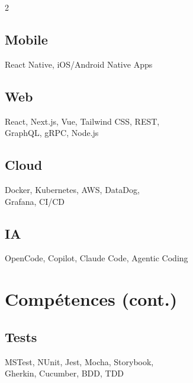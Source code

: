 \documentclass{article}
\begin{document}
\begin{paracol}{2}
\begin{leftcolumn}
    \subsection{Mobile}
    React Native, iOS/Android Native Apps

    \vspace{0.5em}

    \subsection{Web}
    React, Next.js, Vue, Tailwind CSS, REST, \\
    GraphQL, gRPC, Node.js

    \vspace{0.5em}

    \subsection{Cloud}
    Docker, Kubernetes, AWS, DataDog,\\
    Grafana, CI/CD

    \vspace{0.5em}

    \subsection{IA}
    OpenCode, Copilot, Claude Code, Agentic Coding

    \pagebreak
    \section{Compétences (cont.)}

    \subsection{Tests}
    MSTest, NUnit, Jest, Mocha, Storybook, \\
    Gherkin, Cucumber, BDD, TDD

    \vspace{0.5em}


\end{leftcolumn}
\end{paracol}
\end{document}
